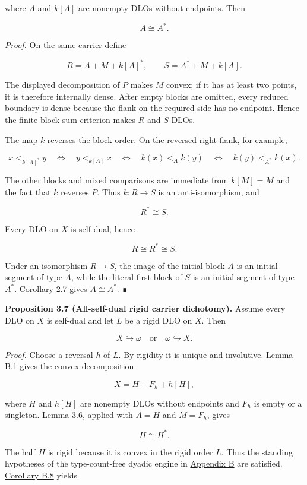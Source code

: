 \documentclass[
  english,
  11pt,
  reqno]{amsart}
\newcounter{none} %
\begin{document}
where \(A\) and \(k[A]\) are nonempty DLOs without endpoints. Then

\[
A\cong A^*.
\]

\emph{Proof.} On the same carrier define

\[
R=A+M+k[A]^*,
\qquad
S=A^*+M+k[A].
\]

The displayed decomposition of \(P\) makes \(M\) convex; if it has at
least two points, it is therefore internally dense. After empty blocks
are omitted, every reduced boundary is dense because the flank on the
required side has no endpoint. Hence the finite block-sum criterion
makes \(R\) and \(S\) DLOs.

The map \(k\) reverses the block order. On the reversed right flank, for
example,

\[
x<_{k[A]^*}y
\quad\Longleftrightarrow\quad
y<_{k[A]}x
\quad\Longleftrightarrow\quad
k(x)<_A k(y)
\quad\Longleftrightarrow\quad
k(y)<_{A^*}k(x).
\]

The other blocks and mixed comparisons are immediate from \(k[M]=M\) and
the fact that \(k\) reverses \(P\). Thus \(k:R\to S\) is an
anti-isomorphism, and

\[
R^*\cong S.
\]

Every DLO on \(X\) is self-dual, hence

\[
R\cong R^*\cong S.
\]

Under an isomorphism \(R\to S\), the image of the initial block \(A\) is
an initial segment of type \(A\), while the literal first block of \(S\)
is an initial segment of type \(A^*\). Corollary 2.7 gives
\(A\cong A^*\). ∎

\protect{}\label{prop:3-7-all-selfdual-dichotomy}

\textbf{Proposition 3.7 (All-self-dual rigid carrier dichotomy).} Assume
every DLO on \(X\) is self-dual and let \(L\) be a rigid DLO on \(X\).
Then

\[
X\hookrightarrow\omega
\quad\text{or}\quad
\omega\hookrightarrow X.
\]

\emph{Proof.} Choose a reversal \(h\) of \(L\). By rigidity it is unique
and involutive. \hyperref[lem:b-1-reflection-split]{Lemma B.1} gives the
convex decomposition

\[
X=H+F_h+h[H],
\]

where \(H\) and \(h[H]\) are nonempty DLOs without endpoints and \(F_h\)
is empty or a singleton. Lemma 3.6, applied with \(A=H\) and \(M=F_h\),
gives

\[
H\cong H^*.
\]

The half \(H\) is rigid because it is convex in the rigid order \(L\).
Thus the standing hypotheses of the type-count-free dyadic engine in
\hyperref[app:dyadic-engine]{Appendix B} are satisfied.
\hyperref[cor:b-8-dyadic-dichotomy]{Corollary B.8} yields
\end{document}
